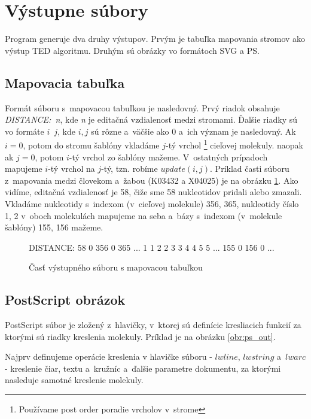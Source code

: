 \section{Výstupne súbory}

Program generuje dva druhy výstupov. Prvým je tabuľka mapovania stromov
ako výstup TED algoritmu. Druhým sú obrázky vo formátoch SVG a PS.

\subsection{Mapovacia tabuľka}

Formát súboru s~mapovacou tabuľkou je nasledovný. Prvý riadok obsahuje
\mbox{\textit{DISTANCE: n}}, kde \textit{n} je editačná vzdialenosť
medzi stromami.
Ďalšie riadky sú vo formáte \mbox{$i$ $j$}, kde \mbox{$i, j$} sú rôzne a~väčšie ako 0
a~ich význam je nasledovný.
Ak \mbox{$i = 0$}, potom do stromu šablóny vkladáme $j$-tý vrchol%
\footnote{Používame post order poradie vrcholov v~strome} cieľovej molekuly.
naopak ak \mbox{$j = 0$}, potom $i$-tý vrchol zo šablóny mažeme. V~ostatných prípadoch
mapujeme $i$-tý vrchol na $j$-tý, tzn. robíme \mbox{$update(i, j)$}.
Príklad časti súboru z~mapovania medzi človekom a~žabou (K03432 a X04025)
je na obrázku \ref{obr:mapping_format}.
Ako vidíme, editačná vzdialenosť je 58, čiže sme 58 nukleotidov pridali alebo zmazali.
Vkladáme nukleotidy s~indexom (v~cieľovej molekule) 356, 365,
nukleotidy číslo 1, 2 v~oboch molekulách mapujeme na seba a~bázy
s~indexom (v~molekule šablóny) 155, 156 mažeme.

\begin{figure}
\begin{code}[fontsize=\scriptsize, frame=none, samepage=true]
DISTANCE: 58
0 356
0 365
  ...
1 1
2 2
3 3
4 4
5 5
  ...
155 0
156 0
  ...
\end{code}
\caption{Časť výstupného súboru s mapovacou tabuľkou}
\label{obr:mapping_format}
\end{figure}




\subsection{PostScript obrázok}

PostScript súbor je zložený z~hlavičky, v~ktorej sú definície kresliacich funkcií za
ktorými sú riadky kreslenia molekuly. Príklad je na obrázku \ref{obr:ps_out}.

Najprv definujeme operácie kreslenia v hlavičke súboru - $lwline$,
$lwstring$ a~$lwarc$ - kreslenie čiar, textu a~kružníc a~ďalšie 
parametre dokumentu, za ktorými nasleduje samotné kreslenie molekuly.

